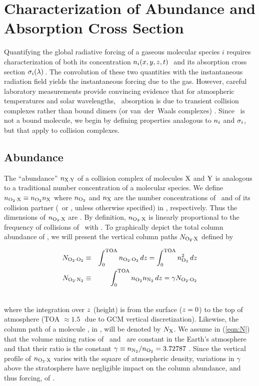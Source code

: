 \documentclass[agupp,twoside]{aguplus} %
\begin{document}
\section{Characterization of Abundance and Absorption Cross
Section}\label{sxn:mth} 

Quantifying the global radiative forcing of a gaseous molecular
species $i$ requires characterization of both its concentration 
$n_i(x,y,z,t)$\,\mlcxcmC\ and its absorption cross section
$\sigma_i(\lambda)$\,\cmSxmlc.  
The convolution of these two quantities with the instantaneous
radiation field yields the instantaneous forcing due to the gas.
However, careful laboratory measurements provide convincing evidence
that for atmospheric temperatures and solar wavelengths, \OdX\
absorption is due to transient collision complexes rather than bound
dimers (or van~der~Waals complexes) \cite[]{GOB90,OTN91}.
Since \OdX\ is not a bound molecule, we begin by defining properties
analogous to $n_i$ and $\sigma_i$, but that apply to collision
complexes.    

\subsection{Abundance}\label{sxn:bun} 
The ``abundance'' $n_{\mathrm{X} \cdot \mathrm{Y}}$ of a collision complex of molecules $\X$
and $\Y$ is analogous to a traditional number concentration of a
molecular species.
We define $n_{\mathrm{O}_{2} \cdot \mathrm{X}} \equiv n_{\mathrm{O}_{2}} n_{\mathrm{X}}$ where $n_{\mathrm{O}_{2}}$ and $n_{\mathrm{X}}$
are the number concentrations of \Od\ and of its collision
partner (\Nd\ or \Od, unless otherwise specified) in \mlcxcmC,
respectively.  
Thus the dimensions of $n_{\mathrm{O}_{2} \cdot \mathrm{X}}$ are \mlcSxcmS. 
By definition, $n_{\mathrm{O}_{2} \cdot \mathrm{X}}$ is linearly proportional to the frequency of  
collisions of \Od\ with \X.
To graphically depict the total column abundance of \OdX, we will
present the vertical column paths $N_{\mathrm{O}_{2} \cdot \mathrm{X}}$ defined by 
\newline\parbox{18.0pc}{ %
\begin{eqnarray}
N_{\mathrm{O}_{2} \cdot \mathrm{O}_{2}} & \equiv & \int_{0}^{\mathrm{TOA}} n_{\mathrm{O}_{2} \cdot \mathrm{O}_{2}} \, dz = 
\int_{0}^{\mathrm{TOA}} n_{\mathrm{O}_{2}}^2 \, dz \nonumber \\ 
N_{\mathrm{O}_{2} \cdot \mathrm{N}_{2}} & \equiv & \int_{0}^{\mathrm{TOA}} n_{\mathrm{O}_{2}} n_{\mathrm{N}_{2}} \, dz = 
\gamma N_{\mathrm{O}_{2} \cdot \mathrm{O}_{2}} \nonumber
\end{eqnarray}
}\hfill %
\parbox{2.0pc}{\begin{eqnarray}\label{eqn:N}\end{eqnarray}}\newline
where the integration over $z$ (height) is from the surface ($z =
0$) to the top of atmosphere (TOA $\approx 1.5$\,\mb\ due to GCM
vertical discretization).   
Likewise, the column path of a molecule \X, in \mlcxcmS, will be
denoted by $N_{\mathrm{X}}$.  
We assume in (\ref{eqn:N}) that the volume mixing ratios of \Nd\ and
\Od\ are constant in the Earth's atmosphere and that their ratio is
the constant $\gamma \equiv n_{\mathrm{N}_{2}}/n_{\mathrm{O}_{2}} = 3.72787$
\cite[][p. 9]{GoY89}.  
Since the vertical profile of $n_{\mathrm{O}_{2} \cdot \mathrm{X}}$ varies with the square of
atmospheric density, variations in $\gamma$ above the stratosphere
have negligible impact on the column abundance, and thus forcing, of 
\OdX.  
\end{document}
